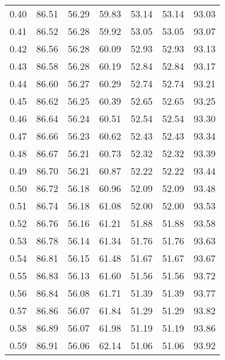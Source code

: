 \begin{tabular}{|c|c|c|c|c|c|c|}
      0.40 &     86.51 &     56.29 &      59.83 &   53.14 &      53.14 &         93.03 \\
      0.41 &     86.52 &     56.28 &      59.92 &   53.05 &      53.05 &         93.07 \\
      0.42 &     86.56 &     56.28 &      60.09 &   52.93 &      52.93 &         93.13 \\
      0.43 &     86.58 &     56.28 &      60.19 &   52.84 &      52.84 &         93.17 \\
      0.44 &     86.60 &     56.27 &      60.29 &   52.74 &      52.74 &         93.21 \\
      0.45 &     86.62 &     56.25 &      60.39 &   52.65 &      52.65 &         93.25 \\
      0.46 &     86.64 &     56.24 &      60.51 &   52.54 &      52.54 &         93.30 \\
      0.47 &     86.66 &     56.23 &      60.62 &   52.43 &      52.43 &         93.34 \\
      0.48 &     86.67 &     56.21 &      60.73 &   52.32 &      52.32 &         93.39 \\
      0.49 &     86.70 &     56.21 &      60.87 &   52.22 &      52.22 &         93.44 \\
      0.50 &     86.72 &     56.18 &      60.96 &   52.09 &      52.09 &         93.48 \\
      0.51 &     86.74 &     56.18 &      61.08 &   52.00 &      52.00 &         93.53 \\
      0.52 &     86.76 &     56.16 &      61.21 &   51.88 &      51.88 &         93.58 \\
      0.53 &     86.78 &     56.14 &      61.34 &   51.76 &      51.76 &         93.63 \\
      0.54 &     86.81 &     56.15 &      61.48 &   51.67 &      51.67 &         93.67 \\
      0.55 &     86.83 &     56.13 &      61.60 &   51.56 &      51.56 &         93.72 \\
      0.56 &     86.84 &     56.08 &      61.71 &   51.39 &      51.39 &         93.77 \\
      0.57 &     86.86 &     56.07 &      61.84 &   51.29 &      51.29 &         93.82 \\
      0.58 &     86.89 &     56.07 &      61.98 &   51.19 &      51.19 &         93.86 \\
      0.59 &     86.91 &     56.06 &      62.14 &   51.06 &      51.06 &         93.92 \\

\end{tabular}
